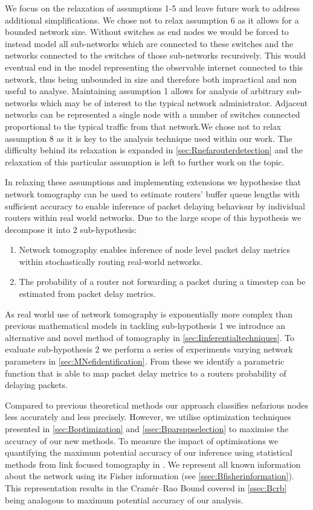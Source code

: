 We focus on the relaxation of assumptions 1-5 and leave future work to address additional simplifications. We chose not to relax assumption 6 as it allows for a bounded network size. Without switches as end nodes we would be forced to instead model all sub-networks which are connected to these switches and the networks connected to the switches of those sub-networks recursively. This would eventual end in the model representing the observable internet connected to this network, thus being unbounded in size and therefore both impractical and non useful to analyse. Maintaining assumption 1 allows for analysis of arbitrary sub-networks which may be of interest to the typical network administrator. Adjacent networks can be represented a single node with a number of switches connected proportional to the typical traffic from that network.We chose not to relax assumption 8 as it is key to the analysis technique used within our work. The difficulty behind its relaxation is expanded in \cref{sec:Rnefarouterdetection} and the relaxation of this particular assumption is left to further work on the topic.\par
In relaxing these assumptions and implementing extensions we hypothesise that network tomography can be used to estimate routers' buffer queue lengths with sufficient accuracy to enable inference of packet delaying behaviour by individual routers within real world networks. Due to the large scope of this hypothesis we decompose it into 2 sub-hypothesis:
\begin{enumerate}
    \item Network tomography enables inference of node level packet delay metrics within stochastically routing real-world networks.
    \item The probability of a router not forwarding a packet during a timestep can be estimated from packet delay metrics.
\end{enumerate}
As real world use of network tomography is exponentially more complex than previous mathematical models in tackling sub-hypothesis 1 we introduce an alternative and novel method of \pdv tomography in \cref{sec:Iinferentialtechniques}. To evaluate sub-hypothesis 2 we perform a series of experiments varying network parameters in \cref{sec:MNefidentification}. From these we identify a parametric function that is able to map packet delay metrics to a routers probability of delaying packets.\par
Compared to previous theoretical methods our approach classifies nefarious nodes less accurately and less precisely. However, we utilise optimization techniques presented in \cref{sec:Boptimization} and \cref{ssec:Bparsppselection} to maximise the accuracy of our new methods. To measure the impact of optimisations we quantifying the maximum potential accuracy of our inference using statistical methods from link focused tomography in \cite{he_fisher_2015}. We represent all known information about the network using its Fisher information (see \cref{ssec:Bfisherinformation}). This representation results in the Cramér–Rao Bound covered in \cref{ssec:Bcrb} being analogous to maximum potential accuracy of our analysis.\par

